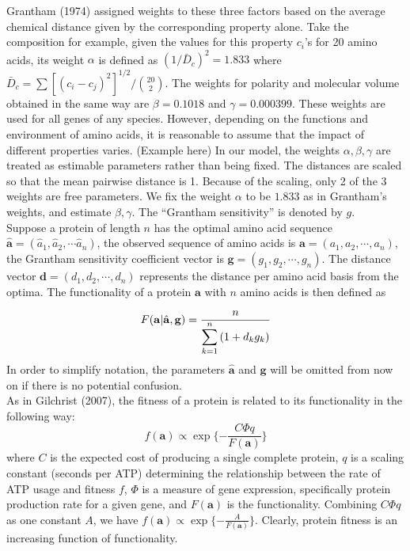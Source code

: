 \documentclass[13pt]{article}
\begin{document}
Grantham (1974) assigned weights to these three factors based on the average chemical distance given by the corresponding property alone.
Take the composition for example, given the values for this property $c_i$'s for 20 amino acids, its weight $\alpha$ is defined as $(1/\bar{D}_c)^2 = 1.833$ where $\bar{D}_c = \sum[(c_i - c_j)^2]^{1/2}/\binom{20}{2}$.
The weights for polarity and molecular volume obtained in the same way are $\beta = 0.1018$ and $\gamma = 0.000399$.
These weights are used for all genes of any species.
However, depending on the functions and environment of amino acids, it is reasonable to assume that the impact of different properties varies. (Example here) In our model, the weights $\alpha, \beta, \gamma$ are treated as estimable parameters rather than being fixed.
The distances are scaled so that the mean pairwise distance is 1.
Because of the scaling, only 2 of the 3 weights are free parameters.
We fix the weight $\alpha$ to be $1.833$ as in Grantham's weights, and estimate $\beta, \gamma$.
The ``Grantham sensitivity'' is denoted by $g$.\\

Suppose a protein of length $n$ has the optimal amino acid sequence $\hat{\mathbf{a}} = (\hat{a}_1, \hat{a}_2, \cdots \hat{a}_n)$, the observed sequence of amino acids is $\mathbf{a} = (a_1, a_2, \cdots, a_n)$, the Grantham sensitivity coefficient vector is  $\mathbf{g}=(g_1,g_2,\cdots,g_n)$.
The distance vector $\mathbf{d} = (d_1, d_2, \cdots, d_n)$ represents the distance per amino acid basis from the optima.
The functionality of a protein $\mathbf{a}$ with $n$ amino acids is then defined as

\begin{equation}
F(\mathbf{a}| \hat{\mathbf{a}},\mathbf{g})  =  \frac{n}{\displaystyle  \sum_{k=1}^n{(1+d_kg_k)}} \label{eq:harmonic}\\
\end{equation}
In order to simplify notation, the parameters $\hat{\mathbf{a}}$ and $\mathbf{g}$ will be omitted from now on if there is no potential confusion.\\

As in Gilchrist (2007), the fitness of a protein is related to its functionality in the following way:
\[f(\mathbf{a}) \propto \exp\{-\frac{C\Phi q}{F(\mathbf{a})}\}\]
where $C$ is the expected cost of producing a single complete protein, $q$ is a scaling constant (seconds per ATP) determining the relationship between the rate of ATP usage and fitness $f$, $\Phi$ is a measure of gene expression, specifically protein production rate for a given gene, and $F(\mathbf{a})$ is the functionality.
Combining $C\Phi q$ as one constant $A$, we have
$f(\mathbf{a}) \propto \exp\{-\frac{A}{F(\mathbf{a})}\}$.
Clearly, protein fitness is an increasing function of functionality.\\
\end{document}
